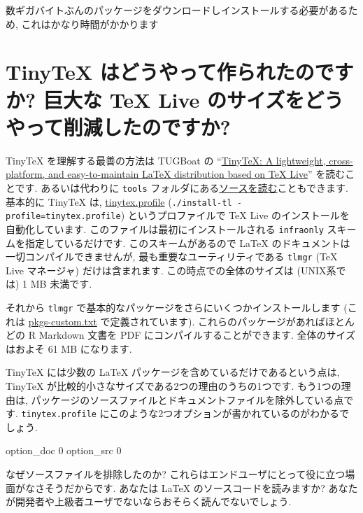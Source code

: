 \documentclass[
  xelatex,ja=standard,jafont=noto]{bxjsreport}
\newenvironment{Shaded}{\begin{snugshade}}{\end{snugshade}}
\newcommand{\NormalTok}[1]{#1}
\begin{document}
数ギガバイトぶんのパッケージをダウンロードしインストールする必要があるため,
これはかなり時間がかかります

\hypertarget{faq-size}{%
\section{TinyTeX はどうやって作られたのですか? 巨大な TeX Live
のサイズをどうやって削減したのですか?}\label{faq-size}}

TinyTeX を理解する最善の方法は TUGBoat の
``\href{https://tug.org/TUGboat/Contents/contents40-1.html}{TinyTeX: A
lightweight, cross-platform, and easy-to-maintain LaTeX distribution
based on TeX Live}'' を読むことです. あるいは代わりに \texttt{tools}
フォルダにある\href{https://github.com/yihui/tinytex/}{ソースを読む}こともできます.
基本的に TinyTeX は,
\href{https://github.com/yihui/tinytex/blob/master/tools/tinytex.profile}{tinytex.profile}
(\texttt{./install-tl\ -profile=tinytex.profile}) というプロファイルで
TeX Live のインストールを自動化しています.
このファイルは最初にインストールされる \texttt{infraonly}
スキームを指定しているだけです. このスキームがあるので LaTeX
のドキュメントは一切コンパイルできませんが,
最も重要なユーティリティである \texttt{tlmgr} (TeX Live マネージャ)
だけは含まれます. この時点での全体のサイズは (UNIX系では) 1 MB 未満です.

それから \texttt{tlmgr}
で基本的なパッケージをさらにいくつかインストールします (これは
\href{https://github.com/yihui/tinytex/blob/master/tools/pkgs-custom.txt}{pkgs-custom.txt}
で定義されています). これらのパッケージがあればほとんどの R Markdown
文書を PDF にコンパイルすることができます. 全体のサイズはおよそ 61 MB
になります.

TinyTeX には少数の LaTeX パッケージを含めているだけであるという点は,
TinyTeX が比較的小さなサイズである2つの理由のうちの1つです.
もう1つの理由は,
パッケージのソースファイルとドキュメントファイルを除外している点です.
\texttt{tinytex.profile}
にこのような2つオプションが書かれているのがわかるでしょう.

\begin{Shaded}
\begin{Highlighting}[]
\NormalTok{option\_doc 0}
\NormalTok{option\_src 0}
\end{Highlighting}
\end{Shaded}

なぜソースファイルを排除したのか?
これらはエンドユーザにとって役に立つ場面がなさそうだからです. あなたは
LaTeX のソースコードを読みますか?
あなたが開発者や上級者ユーザでないならおそらく読んでないでしょう.
\end{document}
